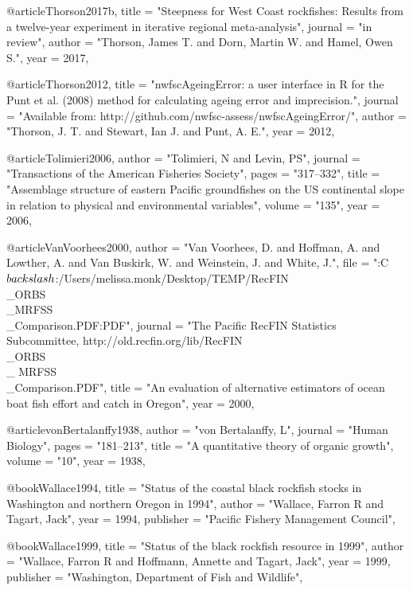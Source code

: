 @article{Thorson2017b,
    title = "{Steepness for West Coast rockfishes:  Results from a twelve-year experiment in iterative regional meta-analysis}",
    journal = "{in review}",
    author = "{Thorson, James T. and Dorn, Martin W. and Hamel, Owen S.}",
    year = 2017,
}

@article{Thorson2012,
    title = "{{nwfscAgeingError}: a user interface in {R} for the {Punt} et al. (2008) method for calculating ageing error and imprecision.}",
    journal = "{Available from: http://github.com/nwfsc-assess/nwfscAgeingError/}",
    author = "{Thorson, J. T. and Stewart, Ian J. and Punt, A. E.}",
    year = 2012,
}

@article{Tolimieri2006,
    author = "{Tolimieri, N and Levin, PS}",
    journal = "{Transactions of the American Fisheries Society}",
    pages = "{317--332}",
    title = "{{Assemblage structure of eastern Pacific groundfishes on the US continental slope in relation to physical and environmental variables}}",
    volume = "{135}",
    year = 2006,
}

@article{VanVoorhees2000,
    author = "{{Van Voorhees}, D. and Hoffman, A. and Lowther, A. and {Van Buskirk}, W. and Weinstein, J. and White, J.}",
    file = "{:C$\\backslash$:/Users/melissa.monk/Desktop/TEMP/RecFIN\\_ORBS\\_MRFSS\\_Comparison.PDF:PDF}",
    journal = "{The Pacific RecFIN Statistics Subcommittee, http://old.recfin.org/lib/RecFIN\\_ORBS\\_ MRFSS\\_Comparison.PDF}",
    title = "{{An evaluation of alternative estimators of ocean boat fish effort and catch in Oregon}}",
    year = 2000,
}

@article{vonBertalanffy1938,
    author = "{von Bertalanffy, L}",
    journal = "{Human Biology}",
    pages = "{181--213}",
    title = "{{A quantitative theory of organic growth}}",
    volume = "{10}",
    year = 1938,
}

@book{Wallace1994,
    title = "{Status of the coastal black rockfish stocks in Washington and northern Oregon in 1994}",
    author = "{Wallace, Farron R and Tagart, Jack}",
    year = 1994,
    publisher = "{Pacific Fishery Management Council}",
}

@book{Wallace1999,
    title = "{Status of the black rockfish resource in 1999}",
    author = "{Wallace, Farron R and Hoffmann, Annette and Tagart, Jack}",
    year = 1999,
    publisher = "{Washington, Department of Fish and Wildlife}",
}

